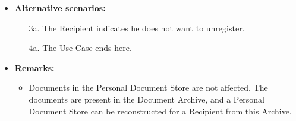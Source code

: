 \documentclass[a4paper,10pt]{article}
\begin{document}
\begin{itemize}
    \item \textbf{Alternative scenarios:} 
    \begin{enumerate}
        \item [3a.] The Recipient indicates he does not want to unregister.
        \item [4a.] The Use Case ends here.
    \end{enumerate}
    
    \item \textbf{Remarks:}
        \begin{itemize}
            \item Documents in the Personal Document Store are not affected. The documents are present in the Document Archive, and a Personal Document Store can be reconstructed for a Recipient from this Archive.
        \end{itemize}
\end{itemize}
\end{document}
